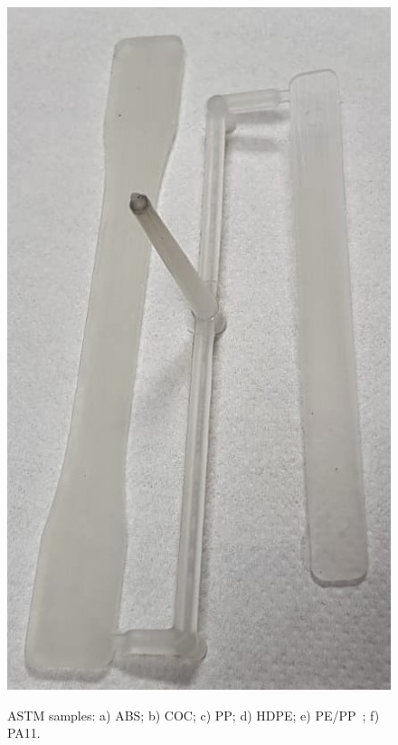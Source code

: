 \documentclass[a4paper, 11pt]{article}
\begin{document}
\begin{figure}[htp]
{\includegraphics[scale=0.25]{PA11ASTM}} \\
\captionsetup{justification=centering}
\caption{ASTM samples: a) ABS; b) COC; c) PP; d) HDPE; e) PE/PP\ ; f) PA11. }
\label{fig:ASTM}
\end{figure}
\end{document}
